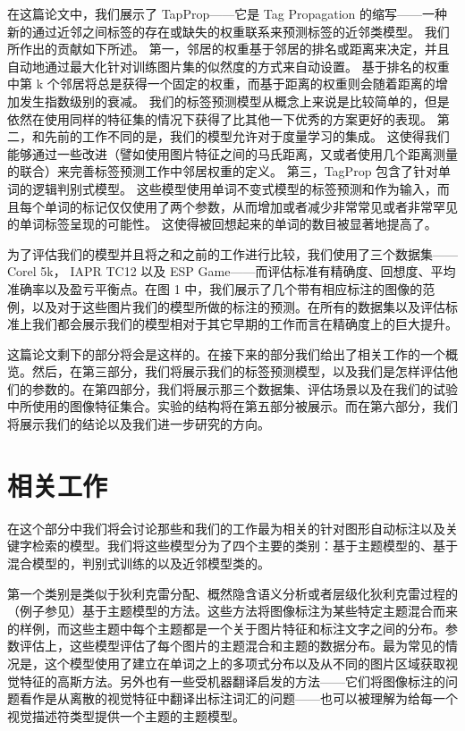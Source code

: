 \documentclass[a4paper,twocolumn]{ctexart}
\begin{document}
在这篇论文中，我们展示了 TapProp——它是 Tag Propagation 的缩写——一种新的通过近邻之间标签的存在或缺失的权重联系来预测标签的近邻类模型。
我们所作出的贡献如下所述。
第一，邻居的权重基于邻居的排名或距离来决定，并且自动地通过最大化针对训练图片集的似然度的方式来自动设置。
基于排名的权重中第 k 个邻居将总是获得一个固定的权重，而基于距离的权重则会随着距离的增加发生指数级别的衰减。
我们的标签预测模型从概念上来说是比较简单的，但是依然在使用同样的特征集的情况下获得了比其他一下优秀的方案更好的表现。
第二，和先前的工作不同的是，我们的模型允许对于度量学习的集成。
这使得我们能够通过一些改进（譬如使用图片特征之间的马氏距离，又或者使用几个距离测量的联合）来完善标签预测工作中邻居权重的定义。
第三，TagProp 包含了针对单词的逻辑判别式模型。
这些模型使用单词不变式模型的标签预测和作为输入，而且每个单词的标记仅仅使用了两个参数，从而增加或者减少非常常见或者非常罕见的单词标签呈现的可能性。
这使得被回想起来的单词的数目被显著地提高了。

为了评估我们的模型并且将之和之前的工作进行比较，我们使用了三个数据集—— Corel 5k， IAPR TC12 以及 ESP Game——而评估标准有精确度、回想度、平均准确率以及盈亏平衡点。在图 1 中，我们展示了几个带有相应标注的图像的范例，以及对于这些图片我们的模型所做的标注的预测。在所有的数据集以及评估标准上我们都会展示我们的模型相对于其它早期的工作而言在精确度上的巨大提升。

这篇论文剩下的部分将会是这样的。在接下来的部分我们给出了相关工作的一个概览。然后，在第三部分，我们将展示我们的标签预测模型，以及我们是怎样评估他们的参数的。在第四部分，我们将展示那三个数据集、评估场景以及在我们的试验中所使用的图像特征集合。实验的结构将在第五部分被展示。而在第六部分，我们将展示我们的结论以及我们进一步研究的方向。

\part{相关工作}

在这个部分中我们将会讨论那些和我们的工作最为相关的针对图形自动标注以及关键字检索的模型。我们将这些模型分为了四个主要的类别：基于主题模型的、基于混合模型的，判别式训练的以及近邻模型类的。

第一个类别是类似于狄利克雷分配、概然隐含语义分析或者层级化狄利克雷过程的（例子参见\cite{1,20,25}）基于主题模型的方法。这些方法将图像标注为某些特定主题混合而来的样例，而这些主题中每个主题都是一个关于图片特征和标注文字之间的分布。参数评估上，这些模型评估了每个图片的主题混合和主题的数据分布。最为常见的情况是，这个模型使用了建立在单词之上的多项式分布以及从不同的图片区域获取视觉特征的高斯方法。另外也有一些受机器翻译启发的方法\cite{4}——它们将图像标注的问题看作是从离散的视觉特征中翻译出标注词汇的问题——也可以被理解为给每一个视觉描述符类型提供一个主题的主题模型。
\end{document}
